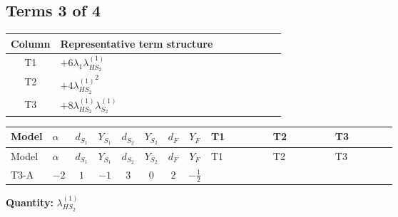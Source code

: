 \documentclass[8pt]{article}
\begin{document}
\begin{landscape}
\subsection*{Terms 3 of 4}
\begin{center}
\begin{tabular}{@{}c >{\raggedright\arraybackslash}p{0.82\linewidth}@{}}
\toprule
Column & Representative term structure \\
\midrule
T1 & \(\displaystyle +6 {\lambda_1} {\lambda_{HS_2}^{(1)}}\) \\
\midrule
T2 & \(\displaystyle +4 {\lambda_{HS_2}^{(1)}}^2\) \\
\midrule
T3 & \(\displaystyle +8 {\lambda_{HS_2}^{(1)}} {\lambda_{S_2}^{(1)}}\) \\
\midrule
\bottomrule
\end{tabular}
\end{center}
\smallskip
\tiny
\begin{longtable}{@{}llcccccc >{\raggedright\arraybackslash}p{0.21\linewidth} >{\raggedright\arraybackslash}p{0.21\linewidth} >{\raggedright\arraybackslash}p{0.21\linewidth}@{}}
\toprule
Model & $\alpha$ & $d_{S_1}$ & $Y_{S_1}$ & $d_{S_2}$ & $Y_{S_2}$ & $d_F$ & $Y_F$ & T1 & T2 & T3 \\
\midrule
\endfirsthead
\toprule
Model & $\alpha$ & $d_{S_1}$ & $Y_{S_1}$ & $d_{S_2}$ & $Y_{S_2}$ & $d_F$ & $Y_F$ & T1 & T2 & T3 \\
\midrule
\endhead
T3-A & $-2$ & $1$ & $-1$ & $3$ & $0$ & $2$ & $-\frac{1}{2}$ & \scriptsize\adjustbox{max width=\linewidth}{$\begin{gathered} +6 {\lambda_1} {\lambda_{HS_2}^{(1)}}\end{gathered}$} & \scriptsize\adjustbox{max width=\linewidth}{$\begin{gathered} +4 {\lambda_{HS_2}^{(1)}}^2\end{gathered}$} & \scriptsize\adjustbox{max width=\linewidth}{$\begin{gathered} +8 {\lambda_{HS_2}^{(1)}} {\lambda_{S_2}^{(1)}}\end{gathered}$} \\
\midrule
\bottomrule
\end{longtable}
\clearpage
\noindent\textbf{Quantity: }$\lambda_{HS_2}^{(1)}$\par\smallskip

\end{landscape}
\end{document}
